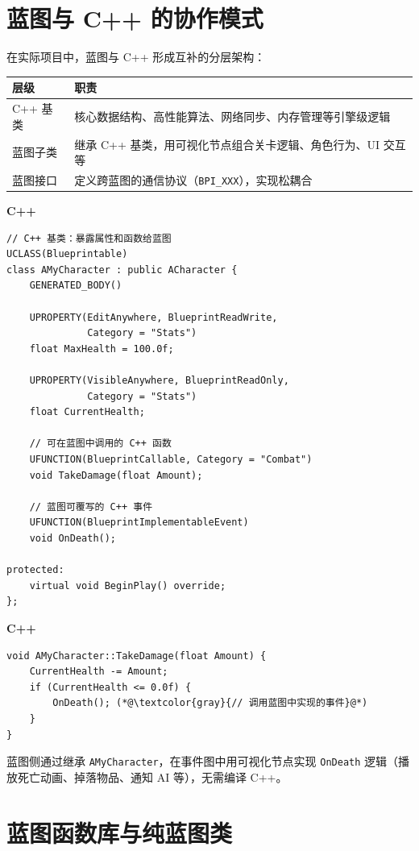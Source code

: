 \documentclass[12pt,a4paper,fontset=fandol]{ctexbook}
\newcommand{\Tp}[1]{\texttt{#1}}
\newcommand{\cpplabel}{%
  \noindent\begin{tcolorbox}[colback=algheadbg,coltext=white,
    sharp corners,boxrule=0pt,width=3.0em,height=1.4em,
    halign=center,valign=center,nobeforeafter,left=0pt,right=0pt,
    top=0pt,bottom=0pt]\small\bfseries C++\end{tcolorbox}}
\begin{document}
\section{蓝图与 C++ 的协作模式}\label{sec:bp-cpp}

在实际项目中，蓝图与 C++ 形成互补的分层架构：

\begin{center}
\begin{tabularx}{\textwidth}{lX}
\toprule
\textbf{层级} & \textbf{职责} \\
\midrule
C++ 基类 & 核心数据结构、高性能算法、网络同步、内存管理等引擎级逻辑 \\
蓝图子类 & 继承 C++ 基类，用可视化节点组合关卡逻辑、角色行为、UI 交互等 \\
蓝图接口 & 定义跨蓝图的通信协议（\Tp{BPI\_XXX}），实现松耦合 \\
\bottomrule
\end{tabularx}
\end{center}

\cpplabel
\begin{lstlisting}[style=cppstyle]
// C++ 基类：暴露属性和函数给蓝图
UCLASS(Blueprintable)
class AMyCharacter : public ACharacter {
    GENERATED_BODY()

    UPROPERTY(EditAnywhere, BlueprintReadWrite,
              Category = "Stats")
    float MaxHealth = 100.0f;

    UPROPERTY(VisibleAnywhere, BlueprintReadOnly,
              Category = "Stats")
    float CurrentHealth;

    // 可在蓝图中调用的 C++ 函数
    UFUNCTION(BlueprintCallable, Category = "Combat")
    void TakeDamage(float Amount);

    // 蓝图可覆写的 C++ 事件
    UFUNCTION(BlueprintImplementableEvent)
    void OnDeath();

protected:
    virtual void BeginPlay() override;
};
\end{lstlisting}

\cpplabel
\begin{lstlisting}[style=cppstyle]
void AMyCharacter::TakeDamage(float Amount) {
    CurrentHealth -= Amount;
    if (CurrentHealth <= 0.0f) {
        OnDeath(); (*@\textcolor{gray}{// 调用蓝图中实现的事件}@*)
    }
}
\end{lstlisting}

蓝图侧通过继承 \Tp{AMyCharacter}，在事件图中用可视化节点实现 \Tp{OnDeath} 逻辑（播放死亡动画、掉落物品、通知 AI 等），无需编译 C++。

\section{蓝图函数库与纯蓝图类}\label{sec:bp-lib}
\end{document}
